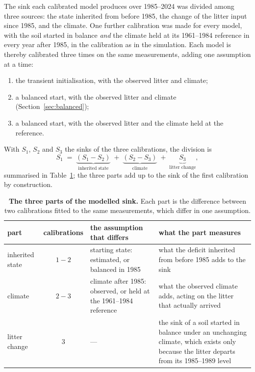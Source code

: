 \documentclass[11pt]{article}
\begin{document}
The sink each calibrated model produces over 1985--2024 was divided among three sources: the state
inherited from before 1985, the change of the litter input since 1985, and the climate. One further
calibration was made for every model, with the soil started in balance \emph{and} the climate held
at its 1961--1984 reference in every year after 1985, in the calibration as in the simulation. Each
model is thereby calibrated three times on the same measurements, adding one assumption at a time:
\begin{enumerate}\itemsep0pt
  \item the transient initialisation, with the observed litter and climate;
  \item a balanced start, with the observed litter and climate (Section~\ref{sec:balanced});
  \item a balanced start, with the observed litter and the climate held at the reference.
\end{enumerate}
With $S_1$, $S_2$ and $S_3$ the sinks of the three calibrations, the division is
\[
  S_1 \;=\; \underbrace{(S_1 - S_2)}_{\text{inherited state}}
       \;+\; \underbrace{(S_2 - S_3)}_{\text{climate}}
       \;+\; \underbrace{S_3}_{\text{litter change}} ,
\]
summarised in Table~\ref{tab:division}; the three parts add up to the sink of the first
calibration by construction.

\begin{table}[htbp]\centering\small
\caption{\textbf{The three parts of the modelled sink.} Each part is the difference between
two calibrations fitted to the same measurements, which differ in one assumption.}
\label{tab:division}
\begin{tabular}{lcp{4.2cm}p{5.2cm}}
\hline
part & calibrations & the assumption that differs & what the part measures \\
\hline
inherited state & $1-2$ & starting state: estimated, or balanced in 1985 &
  what the deficit inherited from before 1985 adds to the sink \\
climate & $2-3$ & climate after 1985: observed, or held at the 1961--1984 reference &
  what the observed climate adds, acting on the litter that actually arrived \\
litter change & $3$ & --- &
  the sink of a soil started in balance under an unchanging climate, which exists only
  because the litter departs from its 1985--1989 level \\
\hline
\end{tabular}
\end{table}
\end{document}

